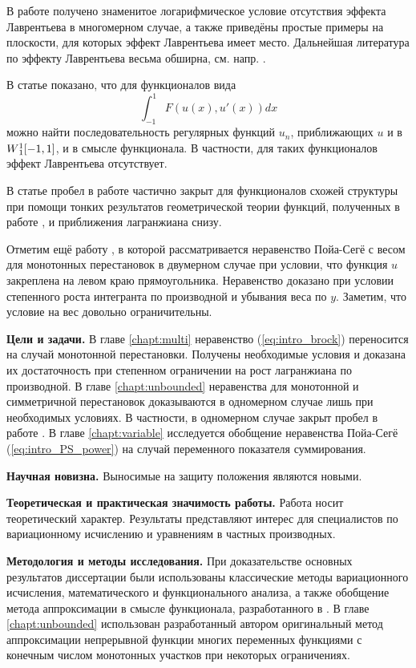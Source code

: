 В работе \cite{Zhikov1995} получено знаменитое логарифмическое условие отсутствия эффекта Лаврентьева в многомерном случае,
а также приведёны простые примеры на плоскости, для которых эффект Лаврентьева имеет место.
Дальнейшая литература по эффекту Лаврентьева весьма обширна, см. напр. \cite{Zhikov2004, ZhikovSurnachev2015}.

В статье \cite{ASC} показано, что для функционалов вида
$$
\int_{-1}^1 F(u(x), u'(x)) dx
$$
можно найти последовательность регулярных функций $u_n$, приближающих $u$ и в $W{}_1^1[-1, 1]$, и в смысле функционала.
В частности, для таких функционалов эффект Лаврентьева отсутствует.

В статье \cite{EspositoTrombetti2007} пробел в работе \cite{Brock} частично закрыт для функционалов схожей структуры
при помощи тонких результатов геометрической теории функций, полученных в работе \cite{CianchiFusco2006},
и приближения лагранжиана снизу.

Отметим ещё работу \cite{Landes}, в которой рассматривается неравенство Пойа-Сегё с весом для монотонных перестановок
в двумерном случае при условии, что функция $u$ закреплена на левом краю прямоугольника.
Неравенство доказано при условии степенного роста интегранта по производной и убывания веса по $y$.
Заметим, что условие на вес довольно ограничительны.

\textbf{Цели и задачи.}
В главе \ref{chapt:multi} неравенство (\ref{eq:intro_brock}) переносится на случай монотонной перестановки.
Получены необходимые условия и доказана их достаточность при степенном ограничении на рост лагранжиана по производной.
В главе \ref{chapt:unbounded} неравенства для монотонной и симметричной перестановок доказываются в одномерном случае
лишь при необходимых условиях.
В частности, в одномерном случае закрыт пробел в работе \cite{Brock}.
В главе \ref{chapt:variable} исследуется обобщение неравенства Пойа-Сегё (\ref{eq:intro_PS_power})
на случай переменного показателя суммирования.

\textbf{Научная новизна.}
Выносимые на защиту положения являются новыми.%

\textbf{Теоретическая и практическая значимость работы.}
Работа носит теоретический характер.
Результаты представляют интерес для специалистов по вариационному исчислению и уравнениям в частных производных.

\textbf{Методология и методы исследования.}
При доказательстве основных результатов диссертации были использованы
классические методы вариационного исчисления, математического и функционального анализа,
а также обобщение метода аппроксимации в смысле функционала, разработанного в \cite{ASC}.
В главе \ref{chapt:unbounded} использован разработанный автором оригинальный метод
аппроксимации непрерывной функции многих переменных функциями с конечным числом монотонных участков при некоторых ограничениях.

